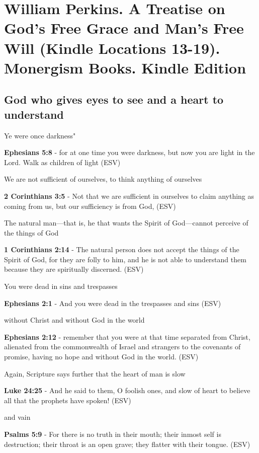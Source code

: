 \documentclass[11pt]{article}
\begin{document}
\section{William Perkins. A Treatise on God's Free Grace and Man's Free Will (Kindle Locations 13-19). Monergism Books. Kindle Edition}
\label{sec:orge47c110}
\subsection{God who gives eyes to see and a heart to understand}
\label{sec:orgffe47f2}

Ye were once darkness"

\textbf{Ephesians 5:8} -  for at one time you were darkness, but now you are light in the Lord.  Walk as children of light  (ESV)

We are not sufficient of ourselves, to think
anything of ourselves

\textbf{2 Corinthians 3:5} -  Not that we are sufficient in ourselves to claim anything as coming from us, but our sufficiency is from God,  (ESV)

The natural man—that is, he that wants the
Spirit of God—cannot perceive of the things of
God

\textbf{1 Corinthians 2:14} -  The natural person does not accept the things of the Spirit of God, for they are folly to him, and he is not able to understand them because they are spiritually discerned.  (ESV)

You were dead in sins and trespasses

\textbf{Ephesians 2:1} - And you were dead in the trespasses and sins  (ESV)

without Christ and without God in the
world

\textbf{Ephesians 2:12} -  remember that you were at that time separated from Christ, alienated from the commonwealth of Israel and strangers to the covenants of promise, having no hope and without God in the world.  (ESV)

Again, Scripture says further that the heart
of man is slow

\textbf{Luke 24:25} -   And he said to them, O foolish ones, and slow of heart to believe all that the prophets have spoken!  (ESV)

and vain

\textbf{Psalms 5:9} -   For there is no truth in their mouth; their inmost self is destruction; their throat is an open grave; they flatter with their tongue.  (ESV)
\end{document}
